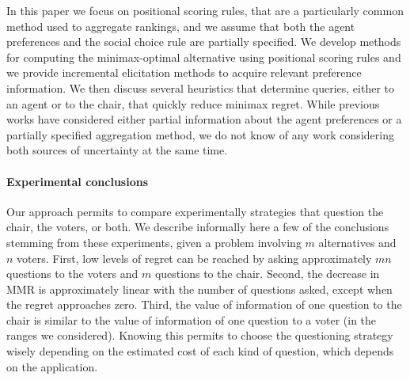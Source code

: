 \documentclass[sigconf, anonymous]{aamas}
\begin{document}
In this paper we focus on positional scoring rules, that are a particularly common method used to aggregate rankings, and we assume that both the agent preferences and the social choice rule are partially specified. We develop methods for computing the minimax-optimal
alternative using positional scoring rules and we provide incremental elicitation methods to acquire relevant preference information. We then discuss several heuristics that determine queries, either to an agent or to the chair, that quickly reduce minimax regret. While previous works have considered either partial information about the agent preferences or a partially specified aggregation method, we do not know of any work considering both sources of uncertainty at the same time.



\paragraph{Experimental conclusions}
Our approach permits to compare experimentally strategies that question the chair, the voters, or both. We describe informally here a few of the conclusions stemming from these experiments, given a problem involving $m$ alternatives and $n$ voters. First, low levels of regret can be reached by asking approximately $m n$ questions to the voters and $m$ questions to the chair. 
Second, the decrease in MMR is approximately linear with the number of questions asked, except when the regret approaches zero.
Third, the value of information of one question to the chair is similar to the value of information of one question to a voter (in the ranges we considered). Knowing this permits to choose the questioning strategy wisely depending on the estimated cost of each kind of question, which depends on the application. 
\end{document}
